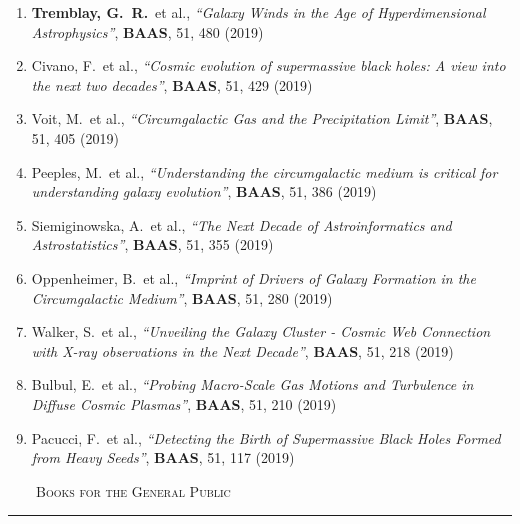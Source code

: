 \documentclass[11pt]{article}
\makeatletter
\def\vhrulefill#1{\leavevmode\leaders\hrule\@height#1\hfill \kern\z@}
\makeatother
\begin{document}
\begin{enumerate}

\item \textbf{Tremblay, G.~R.}~et al., \textit{``Galaxy Winds in the Age of Hyperdimensional Astrophysics''}, \textbf{BAAS}, 51, 480 (2019)

\item Civano, F.~et al., \textit{``Cosmic evolution of supermassive black holes: A view into the next two decades''}, \textbf{BAAS}, 51, 429 (2019)

\item Voit, M.~et al., \textit{``Circumgalactic Gas and the Precipitation Limit''}, \textbf{BAAS}, 51, 405 (2019)

\item Peeples, M.~et al., \textit{``Understanding the circumgalactic medium is critical for understanding galaxy evolution''}, \textbf{BAAS}, 51, 386 (2019)

\item Siemiginowska, A.~et al., \textit{``The Next Decade of Astroinformatics and Astrostatistics''}, \textbf{BAAS}, 51, 355 (2019)


\item Oppenheimer, B.~et al., \textit{``Imprint of Drivers of Galaxy Formation in the Circumgalactic Medium''}, \textbf{BAAS}, 51, 280 (2019)


\item Walker, S.~et al., \textit{``Unveiling the Galaxy Cluster - Cosmic Web Connection with X-ray observations in the Next Decade''}, \textbf{BAAS}, 51, 218 (2019)


\item Bulbul, E.~et al., \textit{``Probing Macro-Scale Gas Motions and Turbulence in Diffuse Cosmic Plasmas''}, \textbf{BAAS}, 51, 210 (2019)


\item Pacucci, F.~et al., \textit{``Detecting the Birth of Supermassive Black Holes Formed from Heavy Seeds''}, \textbf{BAAS}, 51, 117 (2019)


\end{enumerate}


\noindent \textsc{ ~~~~Books for the General Public} \vhrulefill{0.4pt}
\end{document}

